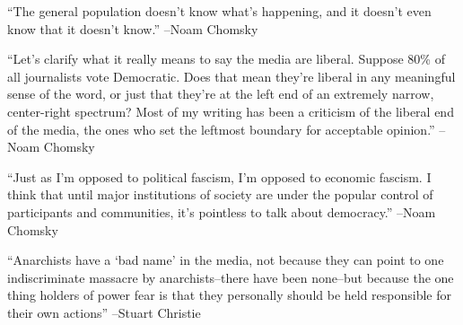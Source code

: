 \documentclass{article}%
\begin{document}
\linebreak%
\vspace{1mm}%
\begin{minipage}{\textwidth}%
\flushleft%
“The general population doesn't know what's happening, and it doesn't even know that it doesn't know.”%
\linebreak%
\vspace{1mm}%
–Noam Chomsky%
\linebreak%
\vspace{1mm}%
\end{minipage}%
\linebreak%
\vspace{1mm}%
\begin{minipage}{\textwidth}%
\flushleft%
“Let's clarify what it really means to say the media are liberal. Suppose 80\% of all journalists vote Democratic. Does that mean they're liberal in any meaningful sense of the word, or just that they're at the left end of an extremely narrow, center{-}right spectrum? Most of my writing has been a criticism of the liberal end of the media, the ones who set the leftmost boundary for acceptable opinion.”%
\linebreak%
\vspace{1mm}%
–Noam Chomsky%
\linebreak%
\vspace{1mm}%
\end{minipage}%
\linebreak%
\vspace{1mm}%
\begin{minipage}{\textwidth}%
\flushleft%
“Just as I'm opposed to political fascism, I'm opposed to economic fascism. I think that until major institutions of society are under the popular control of participants and communities, it's pointless to talk about democracy.”%
\linebreak%
\vspace{1mm}%
–Noam Chomsky%
\linebreak%
\vspace{1mm}%
\end{minipage}%
\linebreak%
\vspace{1mm}%
\begin{minipage}{\textwidth}%
\flushleft%
“Anarchists have a ‘bad name’ in the media, not because they can point to one indiscriminate massacre by anarchists–there have been none–but because the one thing holders of power fear is that they personally should be held responsible for their own actions”%
\linebreak%
\vspace{1mm}%
–Stuart Christie%
\linebreak%
\vspace{1mm}%
\end{minipage}%
\end{document}
